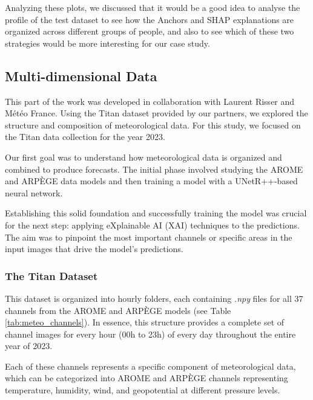 Analyzing these plots, we discussed that it would be a good idea to analyse the profile of the test dataset to see how the Anchors and SHAP explanations are organized across different groups of people, and also to see which of these two strategies would be more interesting for our case study.

\FloatBarrier

\subsection{Multi-dimensional Data}
This part of the work was developed in collaboration with Laurent Risser and Météo France. Using the Titan dataset \cite{titandataset} provided by our partners, we explored the structure and composition of meteorological data. For this study, we focused on the Titan data collection for the year 2023.

Our first goal was to understand how meteorological data is organized and combined to produce forecasts. The initial phase involved studying the AROME and ARPÈGE data models and then training a model with a UNetR++-based neural network.

Establishing this solid foundation and successfully training the model was crucial for the next step: applying eXplainable AI (XAI) techniques to the predictions. The aim was to pinpoint the most important channels or specific areas in the input images that drive the model's predictions.

\subsubsection{The Titan Dataset}
This dataset is organized into hourly folders, each containing \textit{.npy} files for all 37 channels from the AROME \cite{arome} and ARPÈGE \cite{arpege} models (see Table \ref{tab:meteo_channels}). In essence, this structure provides a complete set of channel images for every hour (00h to 23h) of every day throughout the entire year of 2023.

Each of these channels represents a specific component of meteorological data, which can be categorized into AROME and ARPÈGE channels representing temperature, humidity, wind, and geopotential at different pressure levels.

